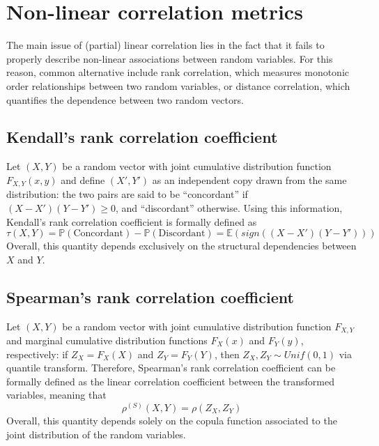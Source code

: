 \documentclass{report}
\begin{document}
\section{Non-linear correlation metrics}
The main issue of (partial) linear correlation lies in the fact that it fails to properly describe non-linear associations between random variables. \newline
For this reason, common alternative include rank correlation, which measures monotonic order relationships between two random variables, or distance correlation, which quantifies the dependence between two random vectors.
\subsection{Kendall's rank correlation coefficient}
Let $\displaystyle (X, Y)$ be a random vector with joint cumulative distribution function $\displaystyle F_{X, Y}(x, y)$ and define $\displaystyle (X', Y')$ as an independent copy drawn from the same distribution: the two pairs are said to be ``concordant'' if $\displaystyle (X - X')(Y - Y') \ge 0$, and ``discordant'' otherwise. \newline
Using this information, Kendall's rank correlation coefficient is formally defined as
\[\tau(X, Y) = \mathbb{P}(\text{Concordant}) - \mathbb{P}(\text{Discordant}) = \mathbb{E}(sign((X - X')(Y - Y')))\]
Overall, this quantity depends exclusively on the structural dependencies between $\displaystyle X$ and $\displaystyle Y$.
\subsection{Spearman's rank correlation coefficient}
Let $\displaystyle (X, Y)$ be a random vector with joint cumulative distribution function $\displaystyle F_{X, Y}$ and marginal cumulative distribution functions $\displaystyle F_X(x)$ and $\displaystyle F_Y(y)$, respectively: if $\displaystyle Z_X = F_X(X)$ and $\displaystyle Z_Y = F_Y(Y)$, then $\displaystyle Z_X, Z_Y \sim Unif(0, 1)$ via quantile transform. \newline
Therefore, Spearman's rank correlation coefficient can be formally defined as the linear correlation coefficient between the transformed variables, meaning that
\[\rho^{(S)}(X, Y) = \rho(Z_X, Z_Y)\]
Overall, this quantity depends solely on the copula function associated to the joint distribution of the random variables.
\end{document}
